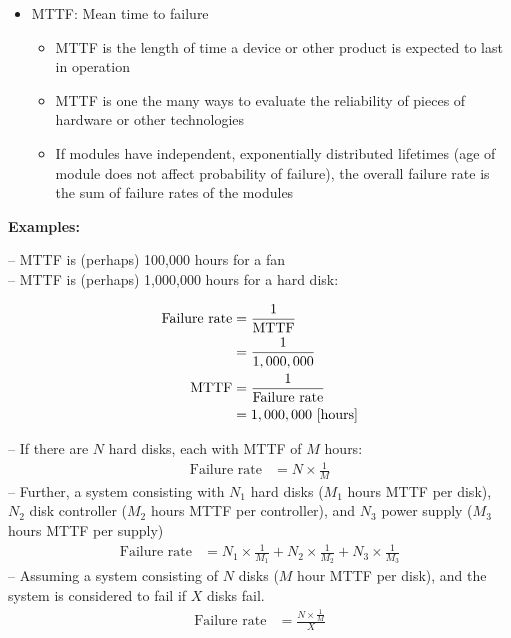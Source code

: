 \documentclass[11pt]{article}
\begin{document}
\begin{itemize}
    \item MTTF: Mean time to failure
    \begin{itemize}
        \item MTTF is the length of time a device or other product is expected to last in operation
        \item MTTF is one the many ways to evaluate the reliability of pieces of hardware or other technologies
        \item If modules have independent, exponentially distributed lifetimes (age of module does not affect probability of failure), the overall failure rate is the sum of failure rates of the modules
    \end{itemize}
\end{itemize}

\noindent \textbf{Examples:}

\noindent-- MTTF is (perhaps) 100,000 hours for a fan\\
-- MTTF is (perhaps) 1,000,000 hours for a hard disk:

    \begin{align}
        \text{Failure rate} &= \frac{1}{\text{MTTF}}\\
        \notag&= \frac{1}{1,000,000}\\
        \text{MTTF} &=  \frac{1}{\text{Failure rate}}\\
        \notag&= 1,000,000\ [\text{hours}]
    \end{align}

\noindent-- If there are \(N\) hard disks, each with MTTF of \(M\) hours:
    \begin{align}
        \text{Failure rate} &= N \times \frac{1}{M}
    \end{align}
\noindent-- Further, a system consisting with \(N_1\) hard disks (\(M_1\) hours MTTF per disk), \(N_2\) disk controller (\(M_2\) hours MTTF per controller), and \(N_3\) power supply (\(M_3\) hours MTTF per supply)
    \begin{align}
        \text{Failure rate} &= N_1 \times \frac{1}{M_1} + N_2 \times \frac{1}{M_2} + N_3 \times \frac{1}{M_3}
    \end{align}
\noindent-- Assuming a system consisting of \(N\) disks (\(M\) hour MTTF per disk), and the system is considered to fail if \(X\) disks fail.
    \begin{align}
        \text{Failure rate} &= \frac{N \times \frac{1}{M}}{X}
    \end{align}
\end{document}
